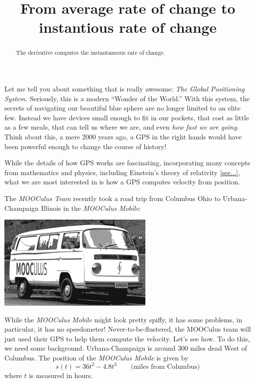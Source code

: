\documentclass{ximera}
\title{From average rate of change to instantious rate of change}
\begin{document}
\begin{abstract}
The derivative computes the instantaneous rate of change. 
\end{abstract}
\maketitle



Let me tell you about something that is really awesome: \textit{The
  Global Positioning System.} Seriously, this is a modern ``Wonder of
the World.'' With this system, the secrets of navigating our beautiful
blue sphere are no longer limited to an elite few. Instead we have
devices small enough to fit in our pockets, that cost as little as a
few meals, that can tell us where we are, and even \textit{how fast we
  are going.} Think about this, a mere 2000 years ago, a GPS in the
right hands would have been powerful enough to change the course of
history!

While the details of how GPS works are fascinating, incorporating many
concepts from mathematics and physics, including Einstein's theory of
relativity \ref{see...}, what we are most interested in is how a GPS
computes velocity from position.

The \textit{MOOCulus Team} recently took a road trip from Columbus
Ohio to Urbana-Champaign Illinois in the \textit{MOOCulus Mobile}:
\begin{image}
\includegraphics[width=3in]{mooculusMobile.pdf}
\end{image}
While the \textit{MOOCulus Mobile} might look pretty spiffy, it has
some problems, in particular, it has no speedometer!
Never-to-be-flustered, the MOOCulus team will just used their GPS to
help them compute the velocity. Let's see how. To do this, we need
some background. Urbana-Champaign is around 300 miles dead West of
Columbus. The position of the \textit{MOOCulus Mobile} is given by
\[
s(t) = 36t^2 -4.8t^3 \qquad\text{(miles from Columbus)}
\]
where $t$ is measured in hours. 
\end{document}
